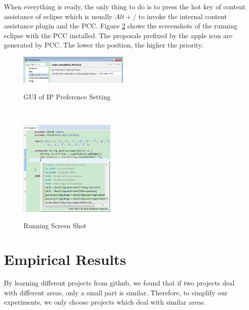 \documentclass{sig-alternate-05-2015}
\begin{document}
When everything is ready, the only thing to do is to press the hot key of content assistance of eclipse which is usually $Alt+/$ to invoke the internal content assistance plugin and the PCC. Figure \ref{codecomprunexample} shows the screenshots of the running eclipse with the PCC installed. The proposals prefixed by the apple icon are generated by PCC. The lower the position, the higher the priority.
\vspace{-0.2cm}
\\\begin{figure}[htbp]
  \centering
  \includegraphics[width=0.48\textwidth]{pics/preferencesetting.png}\\
  \vspace{-0.2cm}
  \caption{GUI of IP Preference Setting}\label{GUIpreference}
\end{figure}
\vspace{-0.5cm}
\\\begin{figure}[htbp]
  \centering
  \includegraphics[width=0.42\textwidth]{pics/codecomprunexample.png}\\
  \vspace{-0.2cm}
  \caption{Running Screen Shot}\label{codecomprunexample}
\end{figure}
\vspace{-0.1cm}

\section{Empirical Results}

By learning different projects from github, we found that if two projects deal with different areas, only a small part is similar. Therefore, to simplify our experiments, we only choose projects which deal with similar areas.
\end{document}
